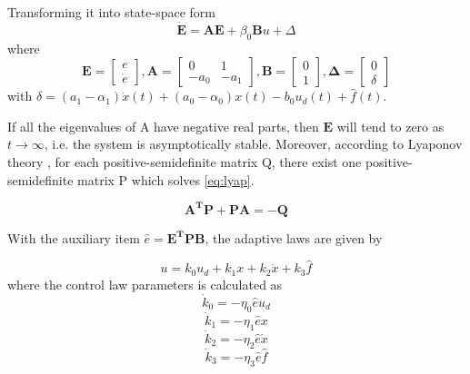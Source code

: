 Transforming it into state-space form
\begin{equation}
  \label{eq:refmodel}
  \mathbf{\dot{E} = AE} + \beta_0\mathbf{B}u + \Delta
\end{equation}
where
\begin{equation}
  \label{eq:matrices}
  \mathbf{E} =
    \begin{bmatrix}
       e\\[0.3em]
       \dot{e}
     \end{bmatrix},
  \mathbf{A} =
    \begin{bmatrix}
       0 & 1\\[0.3em]
       -a_0 & -a_1
     \end{bmatrix},
  \mathbf{B} =
    \begin{bmatrix}
        0\\[0.3em]
        1
    \end{bmatrix},
    \mathbf{\Delta} =
      \begin{bmatrix}
          0\\[0.3em]
          \delta
      \end{bmatrix}
\end{equation}
with $\delta = (a_1-\alpha_1)\dot{x}(t) + (a_0-\alpha_0)x(t) - b_0u_d(t) + \hat{f}(t)$.

If all the eigenvalues of A have negative real parts, then $\mathbf{E}$ will tend to zero as  $t \to \infty$, i.e. the system is asymptotically stable. Moreover, according to Lyaponov theory \cite{Ljung:2003}, for each positive-semidefinite matrix Q, there exist one positive-semidefinite matrix P which solves \eqref{eq:lyap}.

\begin{equation}
  \label{eq:lyap}
  \mathbf{A^TP + PA = -Q}
\end{equation}

With the auxiliary item $\hat{e} = \mathbf{E^TPB}$, the adaptive laws are given by

\begin{equation}
  \label{eq:adaplaws}
  u = k_0u_d + k_1x + k_2\dot{x} + k_3\hat{f}
\end{equation}
where the control law parameters is calculated as
\begin{equation}
  \label{eq:adaplaws1}
  \dot{k}_0 = -\eta_0\hat{e}u_d
\end{equation}
\begin{equation}
  \label{eq:adaplaws2}
  \dot{k}_1 = -\eta_1\hat{e}x
\end{equation}
\begin{equation}
  \label{eq:adaplaws3}
  \dot{k}_2 = -\eta_2\hat{e}\dot{x}
\end{equation}
\begin{equation}
  \label{eq:adaplaws4}
  \dot{k}_3 = -\eta_3\hat{e}\hat{f}
\end{equation}


